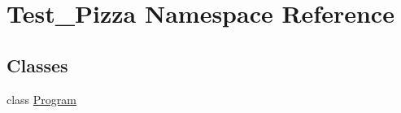 \hypertarget{namespaceTest__Pizza}{}\section{Test\+\_\+\+Pizza Namespace Reference}
\label{namespaceTest__Pizza}
\subsection*{Classes}
\begin{DoxyCompactItemize}
\item 
class \hyperlink{classTest__Pizza_1_1Program}{Program}
\end{DoxyCompactItemize}
